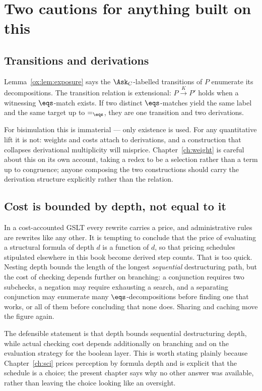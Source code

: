 \section{Two cautions for anything built on this}
\label{ox:sec:cautions}

\subsection{Transitions and derivations}

Lemma~\ref{ox:lem:exposure} says the $\Ask_C$-labelled transitions of $P$ enumerate
its decompositions. The transition relation is extensional: $P \xrightarrow{K} P'$
holds when a witnessing $\eqs$-match exists. If two distinct $\eqs$-matches yield
the same label and the same target up to $=_{\eqs}$, they are one transition and
two derivations.

For bisimulation this is immaterial --- only existence is used. For any
quantitative lift it is not: weights and costs attach to derivations, and a
construction that collapses derivational multiplicity will misprice.
Chapter~\ref{ch:weight} is careful about this on its own account, taking a redex to
be a selection rather than a term up to congruence; anyone composing the two
constructions should carry the derivation structure explicitly rather than the
relation.

\subsection{Cost is bounded by depth, not equal to it}
\label{ox:sec:cost}

In a cost-accounted GSLT every rewrite carries a price, and administrative rules are
rewrites like any other. It is tempting to conclude that the price of evaluating a
structural formula of depth $d$ is a function of $d$, so that pricing schedules
stipulated elsewhere in this book become derived step counts. That is too quick.
Nesting depth bounds the length of the longest \emph{sequential} destructuring
path, but the cost of checking depends further on branching: a conjunction requires
two subchecks, a negation may require exhausting a search, and a separating
conjunction may enumerate many $\eqs$-decompositions before finding one that works,
or all of them before concluding that none does. Sharing and caching move the
figure again.

The defensible statement is that depth bounds sequential destructuring depth, while
actual checking cost depends additionally on branching and on the evaluation
strategy for the boolean layer. This is worth stating plainly because
Chapter~\ref{ch:sci} prices perception by formula depth and is explicit that the
schedule is a choice; the present chapter says why no other answer was available,
rather than leaving the choice looking like an oversight.

